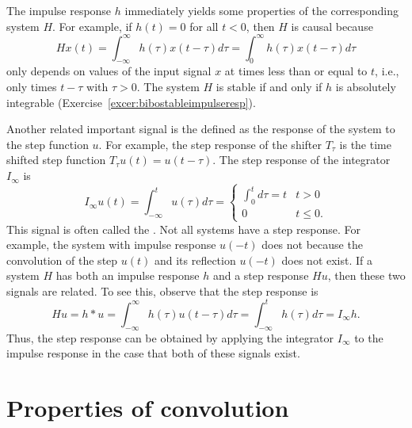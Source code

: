 

The impulse response $h$ immediately yields some properties of the corresponding system $H$.  For example, if $h(t) = 0$ for all $t < 0$, then $H$ is causal because 
\[
H x(t)  =  \int_{-\infty}^{\infty} h(\tau) x(t - \tau) d\tau = \int_{0}^{\infty} h(\tau) x(t - \tau) d\tau
\] 
only depends on values of the input signal $x$ at times less than or equal to $t$, i.e., only times $t - \tau$ with $\tau > 0$.  The system $H$ is stable if and only if $h$ is absolutely integrable (Exercise~\ref{excer:bibostableimpulseresp}).

Another related important signal is the  defined as the response of the system to the step function $u$.  For example, the step response of the shifter $T_\tau$ is the time shifted step function $T_\tau u(t) = u(t - \tau)$.  The step response of the integrator $I_\infty$ is
\[
I_\infty u(t) = \int_{-\infty}^t u(\tau) d\tau = \begin{cases}
\int_{0}^t d\tau  = t & t > 0 \\
0 & t \leq 0.
\end{cases}
\]
This signal is often called the .  Not all systems have a step response.  For example, the system with impulse response $u(-t)$ does not because the convolution of the step $u(t)$ and its reflection $u(-t)$ does not exist.  If a system $H$ has both an impulse response $h$ and a step response $H u$, then these two signals are related.  To see this, observe that the step response is
\begin{equation}\label{eq:stepresponseintegrateimpulseresponse}
Hu = h * u = \int_{-\infty}^{\infty}h(\tau)u(t - \tau) d\tau = \int_{-\infty}^{t} h(\tau) d\tau = I_\infty h. 
\end{equation}
Thus, the step response can be obtained by applying the integrator $I_\infty$ to the impulse response in the case that both of these signals exist.

\section{Properties of convolution}\label{sec:prop-conv}

